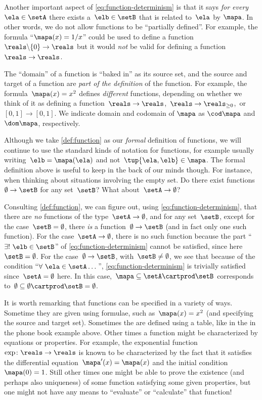 Another important aspect of \cref{eq:function-determinism} is that it says \emph{for every}~$\ela \in \setA$ there exists a~$\elb \in \setB$ that is related to~$\ela$ by $\mapa$.
In other words, we do not allow functions to be ``partially defined''.
For example, the formula ``$\mapa(x) = 1/x$'' could be used to define a function~$\reals \backslash \{ 0 \} \to \reals$ but it would \emph{not} be valid for defining a function~$\reals \to \reals$.

\label{sec:domain-codomain}
The ``domain'' of a function is ``baked in'' as its source set, and the source and target of a function are \emph{part of the definition} of the function.
For example, the formula~$\mapa(x) = x^2$ defines \emph{different} functions, depending on whether we think of it as defining a function~$\reals \to \reals$,~$\reals \to \reals_{\geq 0}$,~or $[0,1] \to [0,1]$.
We indicate domain and codomain of $\mapa$ as $\cod\mapa$ and $\dom\mapa$, respectively.

Although we take \cref{def:function} as our \emph{formal} definition of functions, we will continue to use the standard kinds of notation for functions, for example usually writing~$\elb = \mapa(\ela)$ and not~$\tup{\ela, \elb} \in \mapa$.
The formal definition above is useful to keep in the back of our minds though.
For instance, when thinking about situations involving the empty set.
Do there exist functions~$\emptyset \to \setB$ for any set~$\setB$?
What about~$\setA \to \emptyset$?

Consulting \cref{def:function}, we can figure out, using \cref{eq:function-determinism}, that there are \emph{no} functions of the type~$\setA \to \emptyset$, and for any set~$\setB$, except for the case~$\setB = \emptyset$, there \emph{is} a function~$\emptyset \to \setB$ (and in fact only one such function).
For the case~$\setA \to \emptyset$, there is no such function because the part ``$\exists ! \ \elb \in \setB$'' of \cref{eq:function-determinism} cannot be satisfied, since here~$\setB = \emptyset$.
For the case~$\emptyset \to \setB$, with~$\setB \neq \emptyset$, we see that because of the condition ``$\forall \ \ela \in \setA \dots$'', \cref{eq:function-determinism} is trivially satisfied since~$\setA = \emptyset$ here.
In this case,~$\mapa \subseteq \setA \cartprod \setB$ corresponds to~$\emptyset \subseteq \emptyset \cartprod \setB = \emptyset$.

It is worth remarking that functions can be specified in a variety of ways.
Sometime they are given using formulae, such as~$\mapa(x)=x^2$ (and specifying the source and target set).
Sometimes the are defined using a table, like in the in the phone book example above.
Other times a function might be characterized by equations or properties.
For example, the exponential function~$\exp \colon \reals \to \reals$ is known to be characterized by the fact that it satisfies the differential equation~$\mapa'(x) = \mapa(x)$ and the initial condition~$\mapa(0) =1$.
Still other times one might be able to prove the existence (and perhaps also uniqueness) of some function satisfying some given properties, but one might not have any means to ``evaluate'' or ``calculate'' that function!

